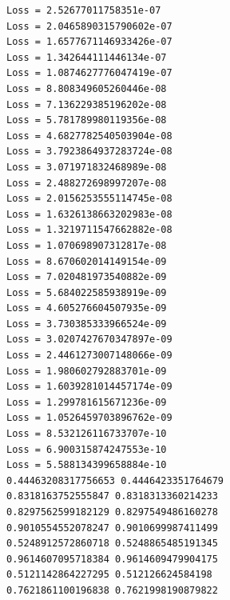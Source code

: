 \documentclass[11pt]{article}
\begin{document}
\begin{Verbatim}[commandchars=\\\{\}]
Loss = 2.52677011758351e-07
Loss = 2.0465890315790602e-07
Loss = 1.6577671146933426e-07
Loss = 1.342644111446134e-07
Loss = 1.0874627776047419e-07
Loss = 8.808349605260446e-08
Loss = 7.136229385196202e-08
Loss = 5.781789980119356e-08
Loss = 4.6827782540503904e-08
Loss = 3.7923864937283724e-08
Loss = 3.071971832468989e-08
Loss = 2.488272698997207e-08
Loss = 2.0156253555114745e-08
Loss = 1.6326138663202983e-08
Loss = 1.3219711547662882e-08
Loss = 1.070698907312817e-08
Loss = 8.670602014149154e-09
Loss = 7.020481973540882e-09
Loss = 5.684022585938919e-09
Loss = 4.605276604507935e-09
Loss = 3.730385333966524e-09
Loss = 3.0207427670347897e-09
Loss = 2.4461273007148066e-09
Loss = 1.980602792883701e-09
Loss = 1.6039281014457174e-09
Loss = 1.299781615671236e-09
Loss = 1.0526459703896762e-09
Loss = 8.532126116733707e-10
Loss = 6.900315874247553e-10
Loss = 5.588134399658884e-10
0.44463208317756653 0.4446423351764679
0.8318163752555847 0.8318313360214233
0.8297562599182129 0.8297549486160278
0.9010554552078247 0.9010699987411499
0.5248912572860718 0.5248865485191345
0.9614607095718384 0.9614609479904175
0.5121142864227295 0.512126624584198
0.7621861100196838 0.7621998190879822
    \end{Verbatim}
\end{document}
